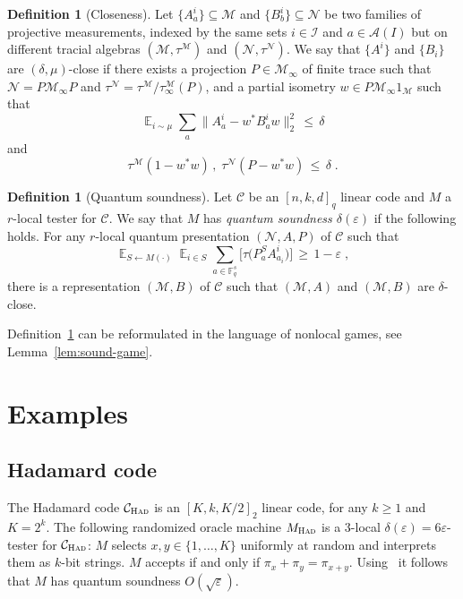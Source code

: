\documentclass[11pt]{article}
\theoremstyle{definition}
\newtheorem{definition}[theorem]{Definition}
\newcommand{\code}{\mathcal{C}}
\DeclareMathOperator*{\Expectation}{\mathbb{E}}
\newcommand{\Es}[1]{\Expectation_{#1}}
\newcommand{\F}{\ensuremath{\mathbb{F}}}
\newcommand{\mA}{\ensuremath{\mathcal{A}}}
\newcommand{\mM}{\ensuremath{\mathcal{M}}}
\newcommand{\mI}{\ensuremath{\mathcal{I}}}
\newcommand{\had}{\textsc{Had}}
\newcommand{\eps}{\varepsilon}
\newcommand{\mN}{\mathcal{N}}
\begin{document}
\begin{definition}[Closeness]\label{def:close}
Let $\{A^i_a\}\subseteq \mM$ and $\{B^i_b\}\subseteq \mN$ be two families of projective measurements, indexed by the same sets $i\in \mI$ and $a\in \mA(I)$ but on different tracial algebras $(\mM,\tau^\mM)$ and $(\mN,\tau^\mN)$. We say that $\{A^i\}$ and $\{B_i\}$ are $(\delta,\mu)$-close if there exists a projection $P\in\mM_\infty$ of finite trace such that $\mN=P\mM_\infty P$ and $\tau^\mN=\tau^\mM/\tau^\mM_\infty(P)$, and a partial isometry $w\in P \mM_\infty 1_\mM$ such that 
\[ \Es{i\sim\mu} \sum_a \big\| A^i_a - w^* B^i_a w \big\|_2^2 \,\leq\,\delta\]
and 
\[ \tau^\mM(1-w^*w)\,,\; \tau^\mN(P-w^*w) \,\leq\, \delta\;.\]
\end{definition}

\begin{definition}[Quantum soundness]\label{def:q-sound}
Let $\code$ be an $[n,k,d]_q$ linear code and $M$ a $r$-local tester for $\code$. We say that $M$ has \emph{quantum soundness $\delta(\eps)$} if the following holds. For any $r$-local quantum presentation $(\mN,A,P)$ of $\code$ such that 
\[ \Es{S\leftarrow M(\cdot)} \Es{i\in S} \sum_{a\in \F_q^s} \big[ \tau\big(  P^S_a  A^i_{a_i}\big) \big] \,\geq \,1-\eps\;,\] 
there is a representation $(\mM,B)$ of $\code$ such that $(\mM,A)$ and $(\mM,B)$ are $\delta$-close. 
\end{definition}

Definition~\ref{def:q-sound} can be reformulated in the language of nonlocal games, see Lemma~\ref{lem:sound-game}. 


		
		
\section{Examples}

\subsection{Hadamard code}

The Hadamard code $\code_\had$ is an $[K,k,K/2]_2$ linear code, for any $k\geq 1$ and $K=2^k$. The following randomized oracle machine $M_\had$ is a $3$-local $\delta(\eps)=6\eps$-tester for $\code_\had$: $M$ selects $x,y\in\{1,\ldots,K\}$ uniformly at random and interprets them as $k$-bit strings. $M$ accepts if and only if $\pi_x + \pi_y  = \pi_{x+y}$. Using~\cite[Theorem 10]{natarajan2016robust} it follows that $M$ has quantum soundness $O(\sqrt{\eps})$. 
\end{document}
